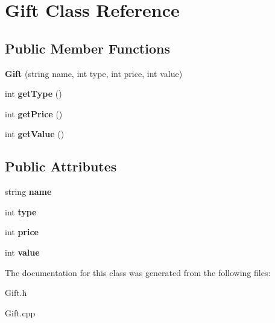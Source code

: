 \hypertarget{class_gift}{}\section{Gift Class Reference}
\label{class_gift}
\subsection*{Public Member Functions}
\begin{DoxyCompactItemize}
\item 
{\bfseries Gift} (string name, int type, int price, int value)\hypertarget{class_gift_aad527a41cdd00dfbb18b4e40f810a7f3}{}\label{class_gift_aad527a41cdd00dfbb18b4e40f810a7f3}

\item 
int {\bfseries get\+Type} ()\hypertarget{class_gift_a999437028eda2a5aac1f3ad1c3f22cf9}{}\label{class_gift_a999437028eda2a5aac1f3ad1c3f22cf9}

\item 
int {\bfseries get\+Price} ()\hypertarget{class_gift_aa114ca9629b5f02e4df6731d33c69373}{}\label{class_gift_aa114ca9629b5f02e4df6731d33c69373}

\item 
int {\bfseries get\+Value} ()\hypertarget{class_gift_aabddc4d671de70d9002461076999a574}{}\label{class_gift_aabddc4d671de70d9002461076999a574}

\end{DoxyCompactItemize}
\subsection*{Public Attributes}
\begin{DoxyCompactItemize}
\item 
string {\bfseries name}\hypertarget{class_gift_abfcf54b38984ff816a223b4140783e14}{}\label{class_gift_abfcf54b38984ff816a223b4140783e14}

\item 
int {\bfseries type}\hypertarget{class_gift_a63fb63fdc6f0821417039da90a54ad4c}{}\label{class_gift_a63fb63fdc6f0821417039da90a54ad4c}

\item 
int {\bfseries price}\hypertarget{class_gift_ad795362f286e8d5d73514fb64ac478b8}{}\label{class_gift_ad795362f286e8d5d73514fb64ac478b8}

\item 
int {\bfseries value}\hypertarget{class_gift_a71d14b92ebfd06993afe584f088bc748}{}\label{class_gift_a71d14b92ebfd06993afe584f088bc748}

\end{DoxyCompactItemize}


The documentation for this class was generated from the following files\+:\begin{DoxyCompactItemize}
\item 
Gift.\+h\item 
Gift.\+cpp\end{DoxyCompactItemize}
